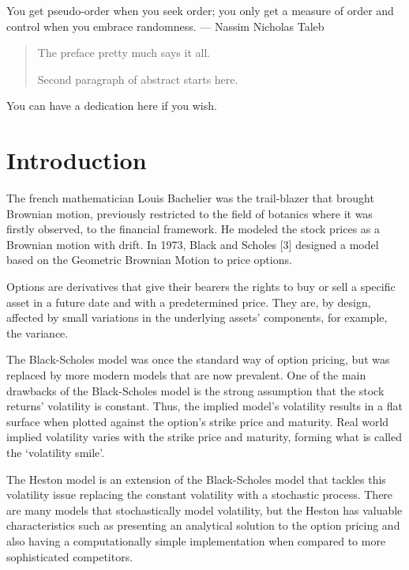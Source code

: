 \documentclass[12pt,twoside]{reedthesis}
\theoremstyle{definition}
\theoremstyle{definition}
\theoremstyle{remark}
\begin{document}
\begin{acknowledgements}
      You get pseudo-order when you seek order; you only get a measure of
      order and control when you embrace randomness. --- Nassim Nicholas Taleb
    \end{acknowledgements}
  
      \hypersetup{linkcolor=black}
    \setcounter{tocdepth}{2}
    \tableofcontents
  
      \listoftables
  
      \listoffigures
      \begin{abstract}
      The preface pretty much says it all. \par  Second paragraph of abstract
      starts here.
    \end{abstract}
      \begin{dedication}
      You can have a dedication here if you wish.
    \end{dedication}
  \mainmatter %
  \pagestyle{fancyplain} %

  \chapter{Introduction}\label{intro}
  
  The french mathematician Louis Bachelier was the trail-blazer that
  brought Brownian motion, previously restricted to the field of botanics
  where it was firstly observed, to the financial framework. He modeled
  the stock prices as a Brownian motion with drift. In 1973, Black and
  Scholes {[}3{]} designed a model based on the Geometric Brownian Motion
  to price options.
  
  Options are derivatives that give their bearers the rights to buy or
  sell a specific asset in a future date and with a predetermined price.
  They are, by design, affected by small variations in the underlying
  assets' components, for example, the variance.
  
  The Black-Scholes model was once the standard way of option pricing, but
  was replaced by more modern models that are now prevalent. One of the
  main drawbacks of the Black-Scholes model is the strong assumption that
  the stock returns' volatility is constant. Thus, the implied model's
  volatility results in a flat surface when plotted against the option's
  strike price and maturity. Real world implied volatility varies with the
  strike price and maturity, forming what is called the `volatility
  smile'.
  
  The Heston model is an extension of the Black-Scholes model that tackles
  this volatility issue replacing the constant volatility with a
  stochastic process. There are many models that stochastically model
  volatility, but the Heston has valuable characteristics such as
  presenting an analytical solution to the option pricing and also having
  a computationally simple implementation when compared to more
  sophisticated competitors.
  
\end{document}
